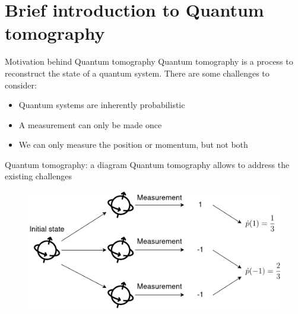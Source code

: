 \documentclass{beamer}
\begin{document}
\section{Brief introduction to Quantum tomography}
\begin{frame}{Motivation behind Quantum tomography}
    Quantum tomography is a process to reconstruct the state of a quantum system.\medbreak
    There are some challenges to consider: 
    \begin{itemize}
        \item Quantum systems are inherently probabilistic
        \item A measurement can only be made once
        \item We can only measure the position or momentum, but not both
    \end{itemize}
\end{frame}
\begin{frame}{Quantum tomography: a diagram}
    Quantum tomography allows to address the existing challenges\medbreak %
    \begin{figure}[H]
            \centering
            \includegraphics[width=\textwidth]{figures/diagram_qt_zoom_final.png}
        
        \end{figure}

\end{frame}
\end{document}
